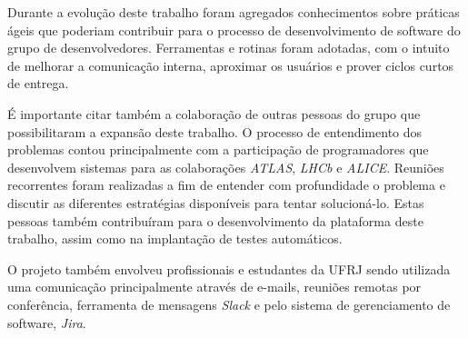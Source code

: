 Durante a evolução deste trabalho foram agregados conhecimentos sobre práticas ágeis que poderiam contribuir para o processo de desenvolvimento de software do grupo de desenvolvedores. Ferramentas e rotinas foram adotadas, com o intuito de melhorar a comunicação interna, aproximar os usuários e prover ciclos curtos de entrega.

É importante citar também a colaboração de outras pessoas do grupo que possibilitaram a expansão deste trabalho. O processo de entendimento dos problemas contou principalmente com a participação de programadores que desenvolvem sistemas para as colaborações \emph{ATLAS}, \emph{LHCb} e \emph{ALICE}. Reuniões recorrentes foram realizadas a fim de entender com profundidade o problema e discutir as diferentes estratégias disponíveis para tentar solucioná-lo. Estas pessoas também contribuíram para o desenvolvimento da plataforma deste trabalho, assim como na implantação de testes automáticos.

O projeto também envolveu profissionais e estudantes da UFRJ sendo utilizada uma comunicação principalmente através de e-mails, reuniões remotas por conferência, ferramenta de mensagens \emph{Slack} e pelo sistema de gerenciamento de software, \emph{Jira}.
